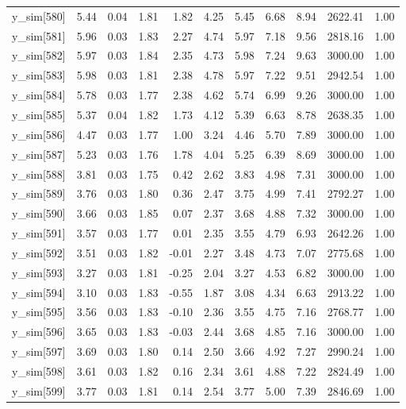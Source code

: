 \begin{table}[ht]
\begin{tabular}{rrrrrrrrrrr}
  y\_sim[580] & 5.44 & 0.04 & 1.81 & 1.82 & 4.25 & 5.45 & 6.68 & 8.94 & 2622.41 & 1.00 \\ 
  y\_sim[581] & 5.96 & 0.03 & 1.83 & 2.27 & 4.74 & 5.97 & 7.18 & 9.56 & 2818.16 & 1.00 \\ 
  y\_sim[582] & 5.97 & 0.03 & 1.84 & 2.35 & 4.73 & 5.98 & 7.24 & 9.63 & 3000.00 & 1.00 \\ 
  y\_sim[583] & 5.98 & 0.03 & 1.81 & 2.38 & 4.78 & 5.97 & 7.22 & 9.51 & 2942.54 & 1.00 \\ 
  y\_sim[584] & 5.78 & 0.03 & 1.77 & 2.38 & 4.62 & 5.74 & 6.99 & 9.26 & 3000.00 & 1.00 \\ 
  y\_sim[585] & 5.37 & 0.04 & 1.82 & 1.73 & 4.12 & 5.39 & 6.63 & 8.78 & 2638.35 & 1.00 \\ 
  y\_sim[586] & 4.47 & 0.03 & 1.77 & 1.00 & 3.24 & 4.46 & 5.70 & 7.89 & 3000.00 & 1.00 \\ 
  y\_sim[587] & 5.23 & 0.03 & 1.76 & 1.78 & 4.04 & 5.25 & 6.39 & 8.69 & 3000.00 & 1.00 \\ 
  y\_sim[588] & 3.81 & 0.03 & 1.75 & 0.42 & 2.62 & 3.83 & 4.98 & 7.31 & 3000.00 & 1.00 \\ 
  y\_sim[589] & 3.76 & 0.03 & 1.80 & 0.36 & 2.47 & 3.75 & 4.99 & 7.41 & 2792.27 & 1.00 \\ 
  y\_sim[590] & 3.66 & 0.03 & 1.85 & 0.07 & 2.37 & 3.68 & 4.88 & 7.32 & 3000.00 & 1.00 \\ 
  y\_sim[591] & 3.57 & 0.03 & 1.77 & 0.01 & 2.35 & 3.55 & 4.79 & 6.93 & 2642.26 & 1.00 \\ 
  y\_sim[592] & 3.51 & 0.03 & 1.82 & -0.01 & 2.27 & 3.48 & 4.73 & 7.07 & 2775.68 & 1.00 \\ 
  y\_sim[593] & 3.27 & 0.03 & 1.81 & -0.25 & 2.04 & 3.27 & 4.53 & 6.82 & 3000.00 & 1.00 \\ 
  y\_sim[594] & 3.10 & 0.03 & 1.83 & -0.55 & 1.87 & 3.08 & 4.34 & 6.63 & 2913.22 & 1.00 \\ 
  y\_sim[595] & 3.56 & 0.03 & 1.83 & -0.10 & 2.36 & 3.55 & 4.75 & 7.16 & 2768.77 & 1.00 \\ 
  y\_sim[596] & 3.65 & 0.03 & 1.83 & -0.03 & 2.44 & 3.68 & 4.85 & 7.16 & 3000.00 & 1.00 \\ 
  y\_sim[597] & 3.69 & 0.03 & 1.80 & 0.14 & 2.50 & 3.66 & 4.92 & 7.27 & 2990.24 & 1.00 \\ 
  y\_sim[598] & 3.61 & 0.03 & 1.82 & 0.16 & 2.34 & 3.61 & 4.88 & 7.22 & 2824.49 & 1.00 \\ 
  y\_sim[599] & 3.77 & 0.03 & 1.81 & 0.14 & 2.54 & 3.77 & 5.00 & 7.39 & 2846.69 & 1.00 \\ 

\end{tabular}
\end{table}
